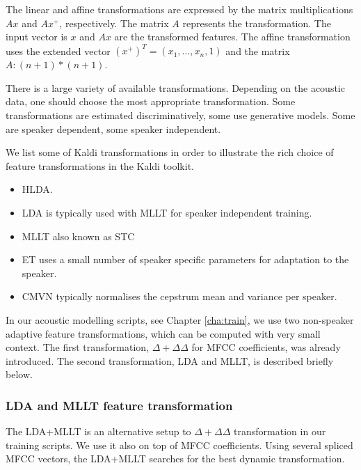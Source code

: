 The linear and affine transformations are expressed by the matrix multiplications $Ax$ and $Ax^+$, respectively. The matrix $A$ represents the transformation. The input vector is $x$ and $Ax$ are the transformed features. The affine transformation uses the extended vector $(x^+)^T = (x_1, \ldots, x_n, 1)$ and the matrix $A: (n+1)*(n+1)$.

There is a large variety of available transformations. Depending on the acoustic data, one should choose the most appropriate transformation. %
Some transformations are estimated discriminatively, some use generative models. Some are speaker dependent, some speaker independent.

We list some of Kaldi transformations in order to illustrate the rich choice of feature transformations in the Kaldi toolkit. %

\begin{itemize}
    \item \acf{HLDA}\cite{gales1999semi}.
    \item \acf{LDA}\cite{gopinath1998maximum} is typically used with \acs{MLLT} for speaker independent training.
    \item \acf{MLLT} also known as \acf{STC}\cite{gopinath1998maximum}
    \item \acf{ET}\cite{povey2011exponential} uses a small number of speaker specific parameters for adaptation to the speaker.
    \item \acf{CMVN}\cite{molau2003feature} typically normalises the cepstrum mean and variance per speaker.
\end{itemize}

In our acoustic modelling scripts, see Chapter \ref{cha:train},  we use two non-speaker adaptive feature transformations, which can be computed with very small context. The first transformation, $\Delta+\Delta\Delta$  for \ac{MFCC} coefficients, was already introduced. The second transformation, \ac{LDA} and \ac{MLLT}, is described briefly below.

\subsubsection*{\acl{LDA} and \ac{MLLT} feature transformation}
The \ac{LDA}+\ac{MLLT} is an alternative setup to $\Delta+\Delta\Delta$ transformation in our training scripts. We use it also on top of \ac{MFCC} coefficients. Using several spliced \ac{MFCC} vectors, the \ac{LDA}+\ac{MLLT} searches for the best dynamic transformation.

